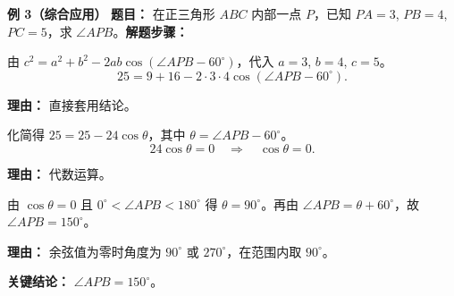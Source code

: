 \begin{examplebox}
	\medskip
	\textbf{\textcolor{CExample}{例 3（综合应用）}}
	\textbf{\textcolor{CExample}{题目：}} 在正三角形 $ABC$ 内部一点 $P$，已知 $PA=3$, $PB=4$, $PC=5$，求 $\angle APB$。\textbf{\textcolor{CExample}{解题步骤：}}
	\begin{description}[style=nextline, leftmargin=2.8em, labelsep=0.5em, itemsep=0.45em]
		\item[\textbf{第一步（代入公式）：}]
			由 $c^2 = a^2+b^2-2ab\cos(\angle APB-60^\circ)$，代入 $a=3$, $b=4$, $c=5$。
			\[
				25 = 9+16-2\cdot3\cdot4\cos(\angle APB-60^\circ).
			\]
			\par\textbf{理由：} 直接套用结论。
		\item[\textbf{第二步（化简）：}]
			化简得 $25=25-24\cos\theta$，其中 $\theta=\angle APB-60^\circ$。
			\[
				24\cos\theta=0\quad\Rightarrow\quad \cos\theta=0.
			\]
			\par\textbf{理由：} 代数运算。
		\item[\textbf{第三步（求角与讨论）：}]
			由 $\cos\theta=0$ 且 $0^\circ<\angle APB<180^\circ$ 得 $\theta=90^\circ$。再由 $\angle APB = \theta + 60^\circ$，故 $\angle APB = 150^\circ$。
			\par\textbf{理由：} 余弦值为零时角度为 $90^\circ$ 或 $270^\circ$，在范围内取 $90^\circ$。
	\end{description}
	\textbf{\textcolor{CExample}{关键结论：}}
	$\angle APB = 150^\circ$。
\end{examplebox}
